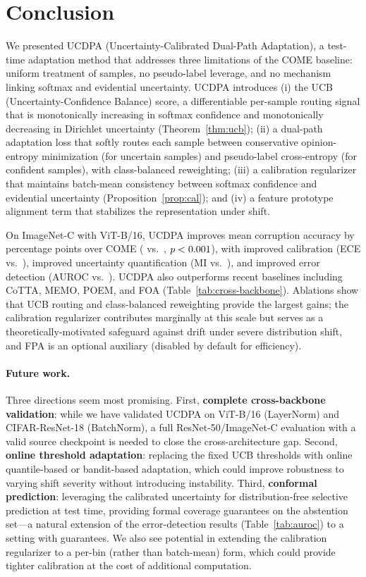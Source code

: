 \section{Conclusion}
\label{sec:conclusion}

We presented UCDPA (Uncertainty-Calibrated Dual-Path Adaptation), a test-time adaptation method that addresses three limitations of the COME baseline: uniform treatment of samples, no pseudo-label leverage, and no mechanism linking softmax and evidential uncertainty. UCDPA introduces (i) the UCB (Uncertainty-Confidence Balance) score, a differentiable per-sample routing signal that is monotonically increasing in softmax confidence and monotonically decreasing in Dirichlet uncertainty (Theorem~\ref{thm:ucb}); (ii) a dual-path adaptation loss that softly routes each sample between conservative opinion-entropy minimization (for uncertain samples) and pseudo-label cross-entropy (for confident samples), with class-balanced reweighting; (iii) a calibration regularizer that maintains batch-mean consistency between softmax confidence and evidential uncertainty (Proposition~\ref{prop:cal}); and (iv) a feature prototype alignment term that stabilizes the representation under shift.

On ImageNet-C with ViT-B/16, UCDPA improves mean corruption accuracy by \ucdpadelta{} percentage points over COME (\ucdpaacc{} vs.\ \comeacc{}, $p < 0.001$), with improved calibration (ECE \ucdpaece{} vs.\ \comeece{}), improved uncertainty quantification (MI \ucdpami{} vs.\ \comemi{}), and improved error detection (AUROC \ucdpaauroc{} vs.\ \comeauroc{}). UCDPA also outperforms recent baselines including CoTTA, MEMO, POEM, and FOA (Table~\ref{tab:cross-backbone}). Ablations show that UCB routing and class-balanced reweighting provide the largest gains; the calibration regularizer contributes marginally at this scale but serves as a theoretically-motivated safeguard against drift under severe distribution shift, and FPA is an optional auxiliary (disabled by default for efficiency).

\paragraph{Future work.}
Three directions seem most promising. First, \textbf{complete cross-backbone validation}: while we have validated UCDPA on ViT-B/16 (LayerNorm) and CIFAR-ResNet-18 (BatchNorm), a full ResNet-50/ImageNet-C evaluation with a valid source checkpoint is needed to close the cross-architecture gap. Second, \textbf{online threshold adaptation}: replacing the fixed UCB thresholds with online quantile-based or bandit-based adaptation, which could improve robustness to varying shift severity without introducing instability. Third, \textbf{conformal prediction}: leveraging the calibrated uncertainty for distribution-free selective prediction at test time, providing formal coverage guarantees on the abstention set---a natural extension of the error-detection results (Table~\ref{tab:auroc}) to a setting with guarantees. We also see potential in extending the calibration regularizer to a per-bin (rather than batch-mean) form, which could provide tighter calibration at the cost of additional computation.
